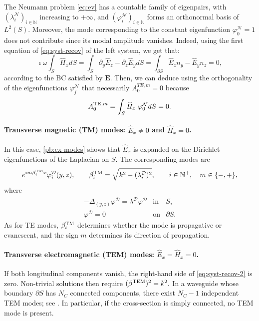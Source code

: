 \documentclass[smallextended]{svjour3}       %
\newcommand{\bfE}{{\mathbf{E}}}
\begin{document}
        \begin{remark}
           The Neumann problem \eqref{eq:ev} has a countable family of eigenpairs, with $(\lambda_i^{\mathcal N})_{i\in\mathbb N}$ increasing to $+\infty$, and $(\varphi_i^{\mathcal N})_{i\in\mathbb N}$ forms an orthonormal basis of $L^2(S)$. Moreover, the mode corresponding to the constant eigenfunction $\varphi_0^{\mathcal N}=1$ does not contribute since its modal amplitude vanishes.  Indeed, using the first equation of \eqref{eq:syst-recov} of the left system, we get that:
		\[
			\imath \omega \int_{S} \widehat{H}_x dS = \int_{S}   \partial_y \widehat{E}_z - \partial_z \widehat{E}_y dS = \int_{\partial S} \widehat{E}_z n_y - \widehat{E}_y n_z  = 0, 
		\] 
		according to the BC satisfied by $\bfE$. Then, we can deduce using the orthogonality of the eigenfunctions $\varphi^\mathcal{N}_j$ that necessarily $A^{TE,m}_0 = 0$ because 
        \[
            A^{{\rm TE},m}_0 = \int_{S} \widehat{H}_x \; \varphi^\mathcal{N}_0 dS = 0.  
        \]
        \end{remark}
        
\paragraph{Transverse magnetic (TM) modes: $\widehat E_x\neq 0$ and $\widehat H_x=0$.}
In this case, \eqref{pb:ex-modes} shows that $\widehat E_x$ is expanded on the Dirichlet eigenfunctions of the Laplacian on $S$. The corresponding modes are
\[
e^{\imath m\beta_i^{\rm TM}x}\varphi_i^{\mathcal D}(y,z),
\qquad
\beta_i^{\rm TM}=\sqrt{k^2-(\lambda_i^{\mathcal D})^2},
\qquad i\in\mathbb N^+,\quad m\in\{-,+\},
\]
where
\[
\begin{array}{|lll}
-\Delta_{(y,z)}\varphi^{\mathcal D}=\lambda^{\mathcal D}\varphi^{\mathcal D} & \text{in} & S,\\
\varphi^{\mathcal D}=0 & \text{on} & \partial S.
\end{array}
\]
As for TE modes, $\beta_i^{\rm TM}$ determines whether the mode is propagative or evanescent, and the sign $m$ determines its direction of propagation.
		
\paragraph{Transverse electromagnetic (TEM) modes: $\widehat E_x=\widehat H_x=0$.}
If both longitudinal components vanish, the right-hand side of \eqref{eq:syst-recov-2} is zero. Non-trivial solutions then require
\(
(\beta^{\rm TEM})^2 = k^2.
\)
In a waveguide whose boundary $\partial S$ has $N_C$ connected components, there exist $N_C-1$ independent TEM modes; see \cite{Bonnet:2021:PGO}. In particular, if the cross-section is simply connected, no TEM mode is present.\\
\end{document}
